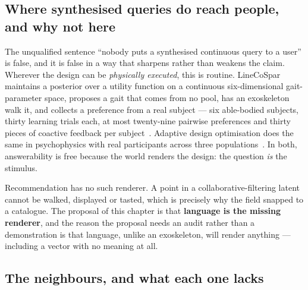 \documentclass[11pt]{article}
\begin{document}
\subsection{Where synthesised queries do reach people, and why not here}

The unqualified sentence ``nobody puts a synthesised continuous query to a user'' is false, and it is
false in a way that sharpens rather than weakens the claim. Wherever the design can be
\emph{physically executed}, this is routine. LineCoSpar maintains a posterior over a utility function
on a continuous six-dimensional gait-parameter space, proposes a gait that comes from no pool, has an
exoskeleton walk it, and collects a preference from a real subject --- six able-bodied subjects, thirty
learning trials each, at most twenty-nine pairwise preferences and thirty pieces of coactive feedback
per subject~\cite{tucker2020linecospar}. Adaptive design optimisation does the same in psychophysics
with real participants across three populations~\cite{ahn2020ado}. In both, answerability is free
because the world renders the design: the question \emph{is} the stimulus.

Recommendation has no such renderer. A point in a collaborative-filtering latent cannot be walked,
displayed or tasted, which is precisely why the field snapped to a catalogue. The proposal of this
chapter is that \textbf{language is the missing renderer}, and the reason the proposal needs an audit
rather than a demonstration is that language, unlike an exoskeleton, will render anything --- including
a vector with no meaning at all.

\subsection{The neighbours, and what each one lacks}
\end{document}
